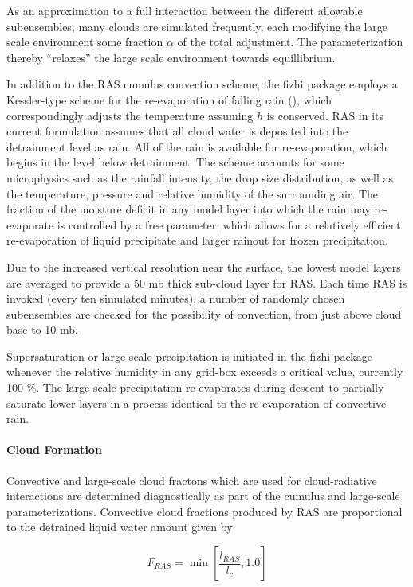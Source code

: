 As an approximation to a full interaction between the different allowable subensembles,
many clouds are simulated frequently, each modifying the large scale environment some fraction
$\alpha$ of the total adjustment. The parameterization thereby ``relaxes'' the large scale environment
towards equillibrium.  

In addition to the RAS cumulus convection scheme, the fizhi package employs a
Kessler-type scheme for the re-evaporation of falling rain (\cite{sudm:88}), which
correspondingly adjusts the temperature assuming $h$ is conserved. RAS in its current
formulation assumes that all cloud water is deposited into the detrainment level as rain.
All of the rain is available for re-evaporation, which begins in the level below detrainment. 
The scheme accounts for some microphysics such as
the rainfall intensity, the drop size distribution, as well as the temperature, 
pressure and relative humidity of the surrounding air.  The fraction of the moisture deficit 
in any model layer into which the rain may re-evaporate is controlled by a free parameter,
which allows for a relatively efficient re-evaporation of liquid precipitate and larger rainout
for frozen precipitation.

Due to the increased vertical resolution near the surface, the lowest model 
layers are averaged to provide a 50 mb thick sub-cloud layer for RAS.  Each time RAS is
invoked (every ten simulated minutes), 
a number of randomly chosen subensembles are checked for the possibility 
of convection, from just above cloud base to 10 mb.  

Supersaturation or large-scale precipitation is initiated in the fizhi package whenever 
the relative humidity in any grid-box exceeds a critical value, currently 100 \%.
The large-scale precipitation re-evaporates during descent to partially saturate 
lower layers in a process identical to the re-evaporation of convective rain. 

 
\paragraph{Cloud Formation}
\label{sec:fizhi:clouds}

Convective and large-scale cloud fractons which are used for cloud-radiative interactions are determined
diagnostically as part of the cumulus and large-scale parameterizations.
Convective cloud fractions produced by RAS are proportional to the 
detrained liquid water amount given by

\[
F_{RAS} = \min\left[ \frac{l_{RAS}}{l_c}, 1.0 \right]
\]


